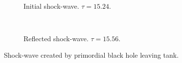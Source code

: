 \begin{figure}
\centering
\begin{subfigure}{\textwidth}

\caption{Initial shock-wave. $\tau  = 15.24$.}
\end{subfigure} \\
\begin{subfigure}{\textwidth}

\caption{Reflected shock-wave. $\tau = 15.56$.}
\end{subfigure}
\caption{Shock-wave created by primordial black hole leaving tank.}
\label{fig:shock}
\end{figure}

%
